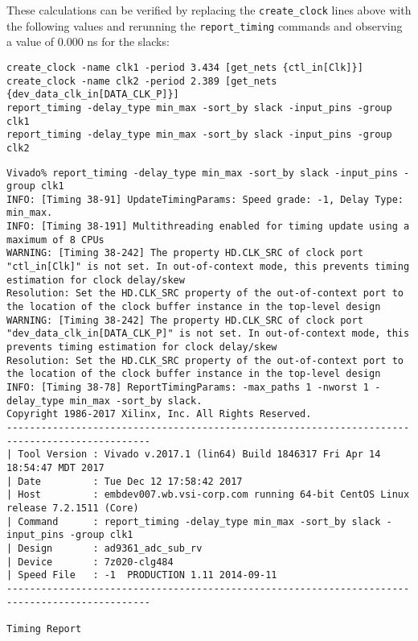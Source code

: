 \documentclass{article}
\begin{document}
\fontsize{10}{12}\selectfont
These calculations can be verified by replacing the \texttt{create\_clock} lines above with the following values and rerunning the \texttt{report\_timing} commands and observing a value of 0.000 ns for the slacks:
\begin{lstlisting}
create_clock -name clk1 -period 3.434 [get_nets {ctl_in[Clk]}]
create_clock -name clk2 -period 2.389 [get_nets {dev_data_clk_in[DATA_CLK_P]}]
report_timing -delay_type min_max -sort_by slack -input_pins -group clk1
report_timing -delay_type min_max -sort_by slack -input_pins -group clk2
\end{lstlisting}
\fontsize{6}{12}\selectfont
\begin{lstlisting}
Vivado% report_timing -delay_type min_max -sort_by slack -input_pins -group clk1
INFO: [Timing 38-91] UpdateTimingParams: Speed grade: -1, Delay Type: min_max.
INFO: [Timing 38-191] Multithreading enabled for timing update using a maximum of 8 CPUs
WARNING: [Timing 38-242] The property HD.CLK_SRC of clock port "ctl_in[Clk]" is not set. In out-of-context mode, this prevents timing estimation for clock delay/skew
Resolution: Set the HD.CLK_SRC property of the out-of-context port to the location of the clock buffer instance in the top-level design
WARNING: [Timing 38-242] The property HD.CLK_SRC of clock port "dev_data_clk_in[DATA_CLK_P]" is not set. In out-of-context mode, this prevents timing estimation for clock delay/skew
Resolution: Set the HD.CLK_SRC property of the out-of-context port to the location of the clock buffer instance in the top-level design
INFO: [Timing 38-78] ReportTimingParams: -max_paths 1 -nworst 1 -delay_type min_max -sort_by slack.
Copyright 1986-2017 Xilinx, Inc. All Rights Reserved.
-----------------------------------------------------------------------------------------------
| Tool Version : Vivado v.2017.1 (lin64) Build 1846317 Fri Apr 14 18:54:47 MDT 2017
| Date         : Tue Dec 12 17:58:42 2017
| Host         : embdev007.wb.vsi-corp.com running 64-bit CentOS Linux release 7.2.1511 (Core)
| Command      : report_timing -delay_type min_max -sort_by slack -input_pins -group clk1
| Design       : ad9361_adc_sub_rv
| Device       : 7z020-clg484
| Speed File   : -1  PRODUCTION 1.11 2014-09-11
-----------------------------------------------------------------------------------------------

Timing Report


\end{lstlisting}
\end{document}

